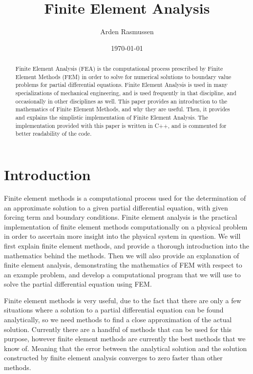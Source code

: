 \documentclass[10pt]{armath}
\title{Finite Element Analysis}
\author{Arden Rasmussen}
\date{\today}
\numberwithin{equation}{section}
\theoremstyle{definition}
\begin{document}
\maketitle

\begin{abstract}
  Finite Element Analysis (FEA) is the computational process prescribed by
  Finite Element Methods (FEM) in order to solve for numerical solutions to
  boundary value problems for partial differential equations. Finite Element
  Analysis is used in many specializations of mechanical engineering, and is
  used frequently in that discipline, and occasionally in other disciplines as
  well. This paper provides an introduction to the mathematics of Finite
  Element Methods, and why they are useful. Then, it provides and explains the
  simplistic implementation of Finite Element Analysis. The implementation
  provided with this paper is written in C++, and is commented for better
  readability of the code.
\end{abstract}

\section{Introduction}%
\label{sec:introduction}

Finite element methods is a computational process used for the determination of
an approximate solution to a given partial differential equation, with given
forcing term and boundary conditions. Finite element analysis is the practical
implementation of finite element methods computationally on a physical problem
in order to ascertain more insight into the physical system in question. We
will first explain finite element methods, and provide a thorough introduction
into the mathematics behind the methods. Then we will also provide an
explanation of finite element analysis, demonstrating the mathematics of FEM
with respect to an example problem, and develop a computational program that we
will use to solve the partial differential equation using FEM.

Finite element methods is very useful, due to the fact that there are only a
few situations where a solution to a partial differential equation can be found
analytically, so we need methods to find a close approximation of the actual
solution. Currently there are a handful of methods that can be used for this
purpose, however finite element methods are currently the best methods that we
know of. Meaning that the error between the analytical solution and the
solution constructed by finite element analysis converges to zero faster than
other methods.
\end{document}
